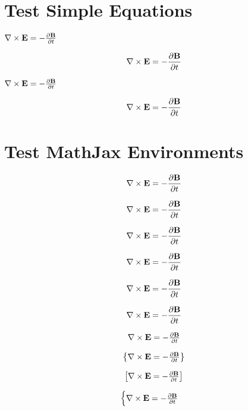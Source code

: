 



$\newcommand\example{\nabla \times \mathbf{E} = - \frac{\partial \mathbf{B}}{\partial t}}$

\chapter{Test Simple Equations}
\label{testsimpleequations}

$\example$

$$\example$$

$\example$

\[\example\]

\chapter{Test MathJax Environments}
\label{testmathjaxenvironments}

\begin{align}
\example
\end{align}

\begin{align*}
\example
\end{align*}

\begin{alignat}{2}
\example
\end{alignat}

\begin{alignat*}{2}
\example
\end{alignat*}

\[
\begin{aligned}
\example
\end{aligned}
\]

\[
\begin{alignedat}{2}
\example
\end{alignedat}
\]

\[
\begin{array}{lcl}
\example
\end{array}
\]

\[
\begin{Bmatrix}
\example
\end{Bmatrix}
\]

\[
\begin{bmatrix}
\example
\end{bmatrix}
\]

\[
\begin{cases}
\example
\end{cases}
\]

